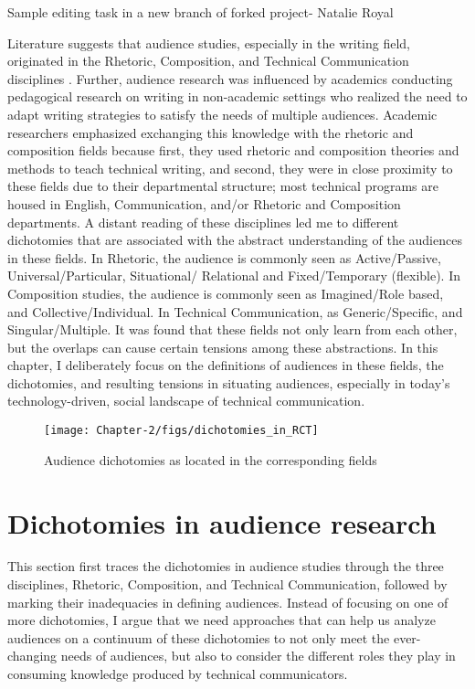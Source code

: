 Sample editing task in a new branch of forked project- Natalie Royal

Literature suggests that audience studies, especially in the writing field, originated in the Rhetoric, Composition, and Technical Communication disciplines \cite{park1982meanings,  breuch2018involving}. Further, audience research was influenced by academics conducting pedagogical research on writing in non-academic settings who realized the need to adapt writing strategies to satisfy the needs of multiple audiences. Academic researchers emphasized exchanging this knowledge with the rhetoric and composition fields because first, they used rhetoric and composition theories and methods to teach technical writing, and second, they were in close proximity to these fields due to their departmental structure; most technical programs are housed in English, Communication, and/or Rhetoric and Composition departments. A distant reading of these disciplines led me to different dichotomies that are associated with the abstract understanding of the audiences in these fields. In Rhetoric, the audience is commonly seen as Active/Passive, Universal/Particular, Situational/ Relational and Fixed/Temporary (flexible). In Composition studies, the audience is commonly seen as Imagined/Role based, and Collective/Individual. In Technical Communication, as Generic/Specific, and Singular/Multiple. It was found that these fields not only learn from each other, but the overlaps can cause certain tensions among these abstractions. In this chapter, I deliberately focus on the definitions of audiences in these fields, the dichotomies, and resulting tensions in situating audiences, especially in today’s technology-driven, social landscape of technical communication.

\begin{figure}[t]
    \begin{center}
        \texttt{[image: Chapter-2/figs/dichotomies\_in\_RCT]}
    \end{center}
    \caption{Audience dichotomies as located in the corresponding fields}
    \label{fig:ch2.1}
\end{figure}

\section{Dichotomies in audience research}
This section first traces the dichotomies in audience studies through the three disciplines, Rhetoric, Composition, and Technical Communication, followed by marking their inadequacies in defining audiences. Instead of focusing on one of more dichotomies, I argue that we need approaches that can help us analyze audiences on a continuum of these dichotomies to not only meet the ever-changing needs of audiences, but also to consider the different roles they play in consuming knowledge produced by technical communicators.

